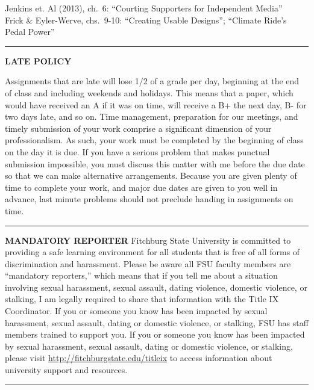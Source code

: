 \documentclass[]{tufte-handout}
\begin{document}
Jenkins et. Al (2013), ch.~6: ``Courting Supporters for Independent
Media''\\
Frick \& Eyler-Werve, chs.~9-10: ``Creating Usable Designs''; ``Climate
Ride's Pedal Power''

\begin{center}\rule{0.5\linewidth}{0.5pt}\end{center}

\textbf{LATE POLICY}

Assignments that are late will lose 1/2 of a grade per day, beginning at
the end of class and including weekends and holidays. This means that a
paper, which would have received an A if it was on time, will receive a
B+ the next day, B- for two days late, and so on. Time management,
preparation for our meetings, and timely submission of your work
comprise a significant dimension of your professionalism. As such, your
work must be completed by the beginning of class on the day it is due.
If you have a serious problem that makes punctual submission impossible,
you must discuss this matter with me before the due date so that we can
make alternative arrangements. Because you are given plenty of time to
complete your work, and major due dates are given to you well in
advance, last minute problems should not preclude handing in assignments
on time.

\begin{center}\rule{0.5\linewidth}{0.5pt}\end{center}

\textbf{MANDATORY REPORTER} Fitchburg State University is committed to
providing a safe learning environment for all students that is free of
all forms of discrimination and harassment. Please be aware all FSU
faculty members are ``mandatory reporters,'' which means that if you
tell me about a situation involving sexual harassment, sexual assault,
dating violence, domestic violence, or stalking, I am legally required
to share that information with the Title IX Coordinator. If you or
someone you know has been impacted by sexual harassment, sexual assault,
dating or domestic violence, or stalking, FSU has staff members trained
to support you. If you or someone you know has been impacted by sexual
harassment, sexual assault, dating or domestic violence, or stalking,
please visit \url{http://fitchburgstate.edu/titleix} to access
information about university support and resources.

\begin{center}\rule{0.5\linewidth}{0.5pt}\end{center}
\end{document}

